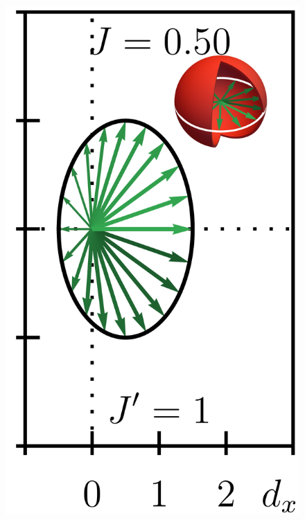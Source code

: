 \documentclass{svmono}
\begin{document}
\begin{figure}[ht]
    \includegraphics{figures/ssh_unnormalized_winding_4.png}

\end{figure}
\end{document}
